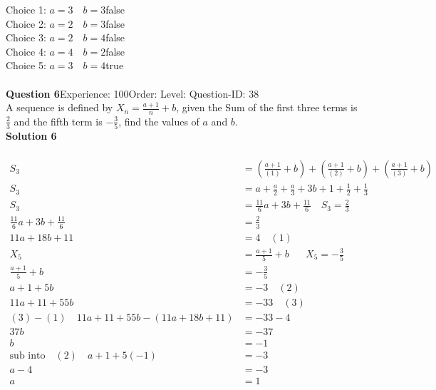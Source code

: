 \documentclass{article}
\begin{document}
Choice 1: \hspace{20pt}$a=3\quad b=3$\hspace{20pt}false\\
Choice 2: \hspace{20pt}$a=2\quad b=3$\hspace{20pt}false\\
Choice 3: \hspace{20pt}$a=2\quad b=4$\hspace{20pt}false\\
Choice 4: \hspace{20pt}$a=4\quad b=2$\hspace{20pt}false\\
Choice 5: \hspace{20pt}$a=3\quad b=4$\hspace{20pt}true\\
\\[4pt]
\noindent\textbf{Question 6}\hspace{20pt}Experience: 100\hspace{20pt}Order: \hspace{20pt}Level: \hspace{20pt}Question-ID: 38\\[2pt]
A sequence is defined by $X_n=\displaystyle\frac{a+1}{n}+b$, given the Sum of the first three terms is $\displaystyle\frac{2}{3}$ and the fifth term is $-\displaystyle\frac{3}{5}$, find the values of $a$ and $b$.\\[4pt]
\noindent\textbf{Solution 6}\\[2pt]
\\[-35pt]\begin{align*}
S_3&=\left(\displaystyle\frac{a+1}{(1)}+b\right)+\left(\displaystyle\frac{a+1}{(2)}+b\right)+\left(\displaystyle\frac{a+1}{(3)}+b\right)\\[2pt]
S_3&=a+\displaystyle\frac{a}{2}+\displaystyle\frac{a}{3}+3b+1+\displaystyle\frac{1}{2}+\frac{1}{3}\\[2pt]
S_3&=\displaystyle\frac{11}{6}a+3b+\frac{11}{6}\quad S_3=\frac{2}{3}\\[2pt]
\displaystyle\frac{11}{6}a+3b+\frac{11}{6}&=\frac{2}{3}\\[2pt]
11a+18b+11&=4\quad(1)\\[12pt]
X_5&=\displaystyle\frac{a+1}{5}+b\hspace{20pt}X_5=-\frac{3}{5}\\[2pt]
\displaystyle\frac{a+1}{5}+b&=-\frac{3}{5}\\[2pt]
a+1+5b&=-3 \quad (2)\\[2pt]
11a+11+55b&=-33\quad (3)\\[12pt]
(3)-(1)\quad 11a+11+55b-(11a+18b+11)&=-33-4\\[2pt]
37b&=-37\\[2pt]
b&=-1\\[12pt]
\text{sub into}\quad (2) \quad a+1+5(-1)&=-3\\[2pt]
a-4&=-3\\[2pt]
a&=1
\end{align*}
\end{document}
